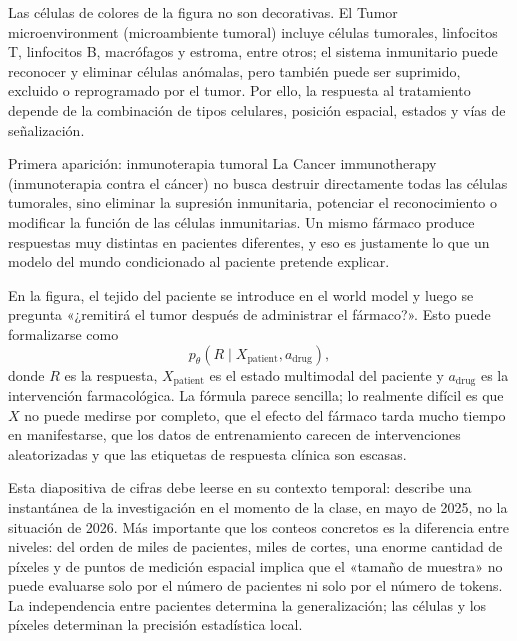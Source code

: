 Las células de colores de la figura no son decorativas. El Tumor microenvironment (microambiente tumoral) incluye células tumorales, linfocitos T, linfocitos B, macrófagos y estroma, entre otros; el sistema inmunitario puede reconocer y eliminar células anómalas, pero también puede ser suprimido, excluido o reprogramado por el tumor. Por ello, la respuesta al tratamiento depende de la combinación de tipos celulares, posición espacial, estados y vías de señalización.

\begin{knowledgebox}{Primera aparición: inmunoterapia tumoral}
La Cancer immunotherapy (inmunoterapia contra el cáncer) no busca destruir directamente todas las células tumorales, sino eliminar la supresión inmunitaria, potenciar el reconocimiento o modificar la función de las células inmunitarias. Un mismo fármaco produce respuestas muy distintas en pacientes diferentes, y eso es justamente lo que un modelo del mundo condicionado al paciente pretende explicar.
\end{knowledgebox}


En la figura, el tejido del paciente se introduce en el world model y luego se pregunta «¿remitirá el tumor después de administrar el fármaco?». Esto puede formalizarse como
\[
p_\theta(R\mid X_{\text{patient}},a_{\text{drug}}),
\]
donde $R$ es la respuesta, $X_{\text{patient}}$ es el estado multimodal del paciente y $a_{\text{drug}}$ es la intervención farmacológica. La fórmula parece sencilla; lo realmente difícil es que $X$ no puede medirse por completo, que el efecto del fármaco tarda mucho tiempo en manifestarse, que los datos de entrenamiento carecen de intervenciones aleatorizadas y que las etiquetas de respuesta clínica son escasas.


Esta diapositiva de cifras debe leerse en su contexto temporal: describe una instantánea de la investigación en el momento de la clase, en mayo de 2025, no la situación de 2026. Más importante que los conteos concretos es la diferencia entre niveles: del orden de miles de pacientes, miles de cortes, una enorme cantidad de píxeles y de puntos de medición espacial implica que el «tamaño de muestra» no puede evaluarse solo por el número de pacientes ni solo por el número de tokens. La independencia entre pacientes determina la generalización; las células y los píxeles determinan la precisión estadística local.

